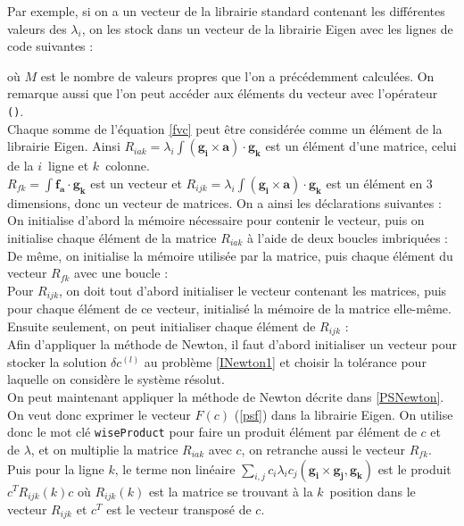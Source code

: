 Par exemple, si on a un vecteur de la librairie standard contenant les différentes valeurs des $\lambda_i$, on les stock dans un vecteur de la librairie Eigen avec les lignes de code suivantes : 

où $M$ est le nombre de valeurs propres que l'on a précédemment calculées. On remarque aussi que l'on peut accéder aux éléments du vecteur avec l'opérateur \texttt{()}.\\

Chaque somme de l'équation \ref{fvc} peut être considérée comme un élément de la librairie Eigen. Ainsi $R_{iak}=\lambda_i\int (\mathbf{g_i}\times\mathbf{a})\cdot\mathbf{g_k}$ est un élément d'une matrice, celui de la $i$\ieme\ ligne et $k$\ieme\ colonne.\\
$R_{fk} = \int \mathbf{f_a}\cdot\mathbf{g_k}$ est un vecteur et $R_{ijk} = \lambda_i\int (\mathbf{g_i}\times\mathbf{a})\cdot\mathbf{g_k}$ est un élément en 3 dimensions, donc un vecteur de matrices. On a ainsi les déclarations suivantes :\\


On initialise d'abord la mémoire nécessaire pour contenir le vecteur, puis on initialise chaque élément de la matrice $R_{iak}$ à l'aide de deux boucles imbriquées :\\


De même, on initialise la mémoire utilisée par la matrice, puis chaque élément du vecteur $R_{fk}$ avec une boucle :\\


Pour $R_{ijk}$, on doit tout d'abord initialiser le vecteur contenant les matrices, puis pour chaque élément de ce vecteur, initialisé la mémoire de la matrice elle-même. Ensuite seulement, on peut initialiser chaque élément de $R_{ijk}$ :\\


Afin d'appliquer la méthode de Newton, il faut d'abord initialiser un vecteur pour stocker la solution $\delta c^{(l)}$ au problème \ref{INewton1} et choisir la tolérance pour laquelle on considère le système résolut.\\


On peut maintenant appliquer la méthode de Newton décrite dans \ref{PSNewton}. On veut donc exprimer le vecteur $F(c)$ (\ref{psf}) dans la librairie Eigen. On utilise donc le mot clé \texttt{wiseProduct} pour faire un produit élément par élément de $c$ et de $\lambda$, et on multiplie la matrice $R_{iak}$ avec $c$, on retranche aussi le vecteur $R_{fk}$.\\
Puis pour la ligne $k$, le terme non linéaire $\sum_{i,j} c_i\lambda_i c_j (\mathbf{g_i}\times \mathbf{g_j}, \mathbf{g_k})$ est le produit $c^TR_{ijk}(k)c$ où $R_{ijk}(k)$ est la matrice se trouvant à la $k$\ieme\ position dans le vecteur $R_{ijk}$ et $c^T$ est le vecteur transposé de $c$.\\


